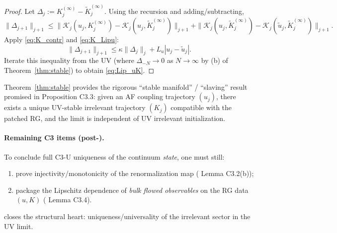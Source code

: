 \begin{proof}
Let $\Delta_j:=K^{(\infty)}_j-\widetilde K^{(\infty)}_j$.
Using the recursion and adding/subtracting,
\[
\|\Delta_{j+1}\|_{j+1}\le
\|\mathcal K_j(u_j,K^{(\infty)}_j)-\mathcal K_j(u_j,\widetilde K^{(\infty)}_j)\|_{j+1}
+
\|\mathcal K_j(u_j,\widetilde K^{(\infty)}_j)-\mathcal K_j(\widetilde u_j,\widetilde K^{(\infty)}_j)\|_{j+1}.
\]
Apply \eqref{eq:K_contr} and \eqref{eq:K_Lipu}:
\[
\|\Delta_{j+1}\|_{j+1}\le \kappa \|\Delta_j\|_{j}+ L_u|u_j-\widetilde u_j|.
\]
Iterate this inequality from the UV (where $\Delta_{-N}\to 0$ as $N\to\infty$ by (b) of Theorem~\ref{thm:stable}) to obtain \eqref{eq:Lip_uK}.
\end{proof}

Theorem~\ref{thm:stable} provides the rigorous ``stable manifold'' / ``slaving'' result promised in Proposition C3.3:
given an AF coupling trajectory $(u_j)$, there exists a unique UV-stable irrelevant trajectory $(K_j)$ compatible with the patched RG,
and the limit is independent of UV irrelevant initialization.

\paragraph{Remaining C3 items (post-).}
To conclude full C3-U uniqueness of the continuum \emph{state}, one must still:
\begin{enumerate}[label=(C3.\arabic*)]
\item prove injectivity/monotonicity of the renormalization map ( Lemma C3.2(b));
\item package the Lipschitz dependence of \emph{bulk flowed observables} on the RG data $(u,K)$ ( Lemma C3.4).
\end{enumerate}
 closes the structural heart: uniqueness/universality of the irrelevant sector in the UV limit.
